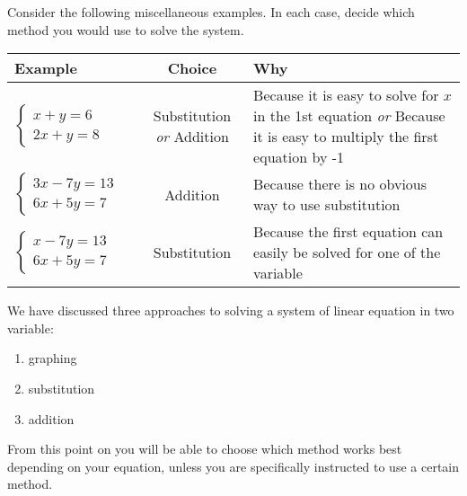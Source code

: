 \begin{myexample}
Consider the following miscellaneous examples. In each case, decide which method
you would use to solve the system.
\end{myexample}
\begin{tabular}{p{3cm}cp{8cm}}
	\toprule
	Example & Choice                         & Why                                                                      \\ 
	\midrule
	$
	\begin{cases}
	x+y =6 &	\\
	2x+y =8 & 
	\end{cases}
	$
	        & Substitution {\em or }Addition & Because it is easy to solve for $x$ in the 1st equation                  
	{\em or}
	Because it is easy to multiply the first equation by -1 \\ 
	$
	\begin{cases}
	3x-7y =13 &\\
	6x+5y =7  & 
	\end{cases}
	$
	        & Addition                       & Because there is no obvious way to use substitution                      \\ 
	$
	\begin{cases}
	x-7y  =13 & \\
	6x+5y =7 &   
	\end{cases}
	$
	        & Substitution                   & Because the first equation can easily be solved for one of the variable \\
	\bottomrule
\end{tabular}
																																																																										
We have discussed three approaches to solving a system of linear equation in two
variable:
\begin{enumerate}
	\item graphing
	\item substitution
	\item addition
\end{enumerate} 
From this point on you will be able to choose which method works best depending
on your equation, unless you are specifically instructed to use a certain method.
